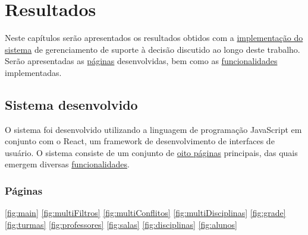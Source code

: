 \chapter{Resultados} \label{chap:resultados} %

Neste capítulos serão apresentados os resultados obtidos com a \hyperref[sec:sistema]{implementação do sistema} de gerenciamento de suporte à decisão discutido ao longo deste trabalho. Serão apresentadas as \hyperref[ssec:paginas]{páginas} desenvolvidas, bem como as \hyperref[ssec:funcionalidades]{funcionalidades} implementadas.




\section{Sistema desenvolvido} \label{sec:sistema}

O sistema foi desenvolvido utilizando a linguagem de programação JavaScript em conjunto com o React, um framework de desenvolvimento de interfaces de usuário. O sistema consiste de um conjunto de \hyperref[ssec:paginas]{oito páginas} principais, das quais emergem diversas \hyperref[ssec:funcionalidades]{funcionalidades}.

\subsection{Páginas} \label{ssec:paginas}

\autoref{fig:main}
\autoref{fig:multiFiltros}
\autoref{fig:multiConflitos}
\autoref{fig:multiDisciplinas}
\autoref{fig:grade}
\autoref{fig:turmas}
\autoref{fig:professores}
\autoref{fig:salas}
\autoref{fig:disciplinas}
\autoref{fig:alunos}

